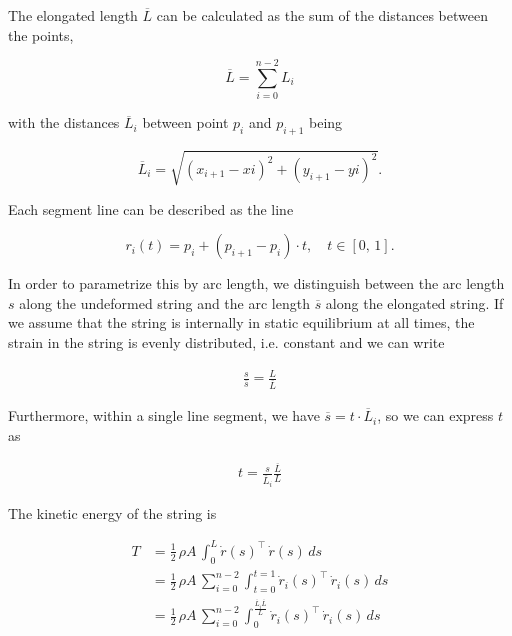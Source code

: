 \newpage

The elongated length $\overline{L}$ can be calculated as the sum of the distances between the points,

$$
\overline{L} = \sum_{i=0}^{n-2} L_{i}
$$

with the distances $\overline{L}_{i}$ between point $p_{i}$ and $p_{i+1}$ being

$$
\overline{L}_{i} = \sqrt{(x_{i+1} - x{i})^2 + (y_{i+1} - y{i})^2}.
$$

Each segment line can be described as the line

$$
r_{i}(t) = p_{i} + (p_{i+1} - p_{i}) \cdot t, \quad t \in [0,\,1].
$$

In order to parametrize this by arc length, we distinguish between the arc length $s$ along the undeformed string and the arc length $\overline{s}$ along the elongated string.
If we assume that the string is internally in static equilibrium at all times, the strain in the string is evenly distributed, i.e. constant and we can write

\begin{align*}
\frac{s}{\overline{s}} = \frac{L}{\overline{L}}
\end{align*}

Furthermore, within a single line segment, we have $\overline{s} = t \cdot \overline{L}_{i}$, so we can express $t$ as

\begin{align*}
t = \frac{s}{\overline{L}_{i}}\frac{\overline{L}}{L}
\end{align*}

The kinetic energy of the string is

\begin{align*}
T &= \frac{1}{2}\,\rho A \, \int_{0}^{L} \dot{r}(s)^\intercal\,\dot{r}(s)\,ds \\
&= \frac{1}{2}\,\rho A \, \sum_{i=0}^{n-2} \int_{t=0}^{t=1} \dot{r}_{i}(s)^\intercal\,\dot{r}_{i}(s)\,ds \\
&= \frac{1}{2}\,\rho A \, \sum_{i=0}^{n-2} \int_{0}^{\frac{\overline{L}_{i}\overline{L}}{L}} \dot{r}_{i}(s)^\intercal\,\dot{r}_{i}(s)\,ds \\
\end{align*}
